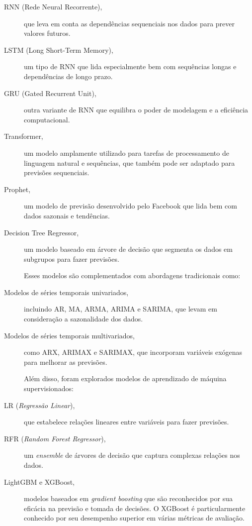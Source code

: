 \begin{description}
	\item [RNN (Rede Neural Recorrente),] que leva em conta as dependências sequenciais nos dados para prever valores futuros.

	\item [LSTM (Long Short-Term Memory),] um tipo de RNN que lida especialmente bem com sequências longas e dependências de longo prazo.

	\item [GRU (Gated Recurrent Unit),] outra variante de RNN que equilibra o poder de modelagem e a eficiência computacional.

	\item [Transformer,] um modelo amplamente utilizado para tarefas de processamento de linguagem natural e sequências, que também pode ser adaptado para previsões sequenciais.

	\item [Prophet,] um modelo de previsão desenvolvido pelo Facebook que lida bem com dados sazonais e tendências.

	\item [Decision Tree Regressor,] um modelo baseado em árvore de decisão que segmenta os dados em subgrupos para fazer previsões.

Esses modelos são complementados com abordagens tradicionais como:

	\item [Modelos de séries temporais univariados,] incluindo AR, MA, ARMA, ARIMA e SARIMA, que levam em consideração a sazonalidade dos dados.

	\item [Modelos de séries temporais multivariados,] como ARX, ARIMAX e SARIMAX, que incorporam variáveis exógenas para melhorar as previsões.

Além disso, foram explorados modelos de aprendizado de máquina supervisionados:

	\item [LR (\textit{Regressão Linear}),] que estabelece relações lineares entre variáveis para fazer previsões.

	\item [RFR (\textit{Random Forest Regressor}),] um \textit{ensemble} de árvores de decisão que captura complexas relações nos dados.

	\item [LightGBM e XGBoost,] modelos baseados em \textit{gradient boosting} que são reconhecidos por sua eficácia na previsão e tomada de decisões. O XGBoost é particularmente conhecido por seu desempenho superior em várias métricas de avaliação.

\end{description}

